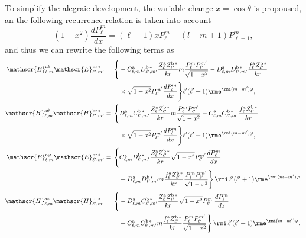 To simplify the alegraic development, the variable change $x=\cos\theta$ is propoused, an the following recurrence relation is taken into account
\begin{equation}
 (1-x^2)\frac{dP_{\ell}^m}{dx} = (\ell+1) x P_{\ell}^{m}-(l-m+1)P_{\ell+1}^{m},
\end{equation}
and thus we can rewrite the following terms as 
\begin{align}
\mathscr{E}_{\ell, m}^{\text{a}\theta}\mathscr{E}_{\ell^{\prime}, m^{\prime}}^{\text{br}\,*}= \, \Bigg\{&-C_{\ell,m}^{\rm a}D_{\ell^{\prime}, m^{\prime}}^{\rm b \, *}\frac{Z_{\ell}^{\rm a}Z_{\ell^{\prime}}^{\rm b\, *}}{k r} m \frac{P_{\ell}^{m}P_{\ell^{\prime}}^{m^{\prime}}}{\sqrt{1-x^2}}-D_{\ell, m}^{\rm a}D_{\ell^{\prime}, m^{\prime}}^{\rm b \, *} \frac{f_{\ell}^{\rm a}Z_{\ell^{\prime}}^{\rm b \, *}}{k r}\nonumber\\
& \times \sqrt{1-x^2} P_{\ell^{\prime}}^{m^{\prime}} \frac{dP_{\ell}^m}{dx}\Bigg\}\ell^{\prime}(\ell^{\prime}+1)  \rme^{\rmi (m-m^{\prime})\varphi },\\
\mathscr{H}_{\ell, m}^{\text{a}\theta}\mathscr{H}_{\ell^{\prime}, m^{\prime}}^{\text{br}\,*}= \, \Bigg\{& D_{\ell,m}^{\rm a}C_{\ell^{\prime}, m^{\prime}}^{\rm b \, *}\frac{Z_{\ell}^{\rm a}Z_{\ell^{\prime}}^{\rm b\, *}}{k r} m \frac{P_{\ell}^{m}P_{\ell^{\prime}}^{m^{\prime}}}{\sqrt{1-x^2}}-C_{\ell, m}^{\rm a}C_{\ell^{\prime}, m^{\prime}}^{\rm b \, *} \frac{f_{\ell}^{\rm a}Z_{\ell^{\prime}}^{\rm b \, *}}{k r}\nonumber\\
& \times \sqrt{1-x^2} P_{\ell^{\prime}}^{m^{\prime}} \frac{dP_{\ell}^m}{dx}\Bigg\}\ell^{\prime}(\ell^{\prime}+1)  \rme^{\rmi (m-m^{\prime})\varphi },\\
\mathscr{E}_{\ell, m}^{\text{a}\varphi}\mathscr{E}_{\ell^{\prime}, m^{\prime}}^{\text{br}\,*} = \, \Bigg\{& C_{\ell, m}^{\rm a} D_{\ell^{\prime}, m^{\prime}}^{\rm b \, *} \frac{Z_{\ell}^{\rm a} Z_{\ell^{\prime}}^{\rm b \, *}}{k r} \sqrt{1-x^2} P_{\ell^{\prime}}^{m^{\prime}} \frac{dP_{\ell}^m}{dx}\nonumber\\
& + D_{\ell, m}^{\rm a} D_{\ell^{\prime}, m^{\prime}}^{\rm b \, *} m \frac{f_{\ell}^{\rm a} Z_{\ell^{\prime}}^{\rm b\, *}}{k r} \frac{P_{\ell}^{m} P_{\ell^{\prime}}^{m^{\prime}}}{\sqrt{1-x^2}} \Bigg\} \, \rmi \, \ell^{\prime}(\ell^{\prime}+1)  \rme^{\rmi (m-m^{\prime})\varphi },\\
\mathscr{H}_{\ell, m}^{\text{a}\varphi}\mathscr{H}_{\ell^{\prime}, m^{\prime}}^{\text{br}\,*} = \, \Bigg\{& -D_{\ell, m}^{\rm a} C_{\ell^{\prime}, m^{\prime}}^{\rm b \, *} \frac{Z_{\ell}^{\rm a} Z_{\ell^{\prime}}^{\rm b \, *}}{k r} \sqrt{1-x^2} P_{\ell^{\prime}}^{m^{\prime}} \frac{dP_{\ell}^m}{dx}\nonumber\\
& + C_{\ell, m}^{\rm a} C_{\ell^{\prime}, m^{\prime}}^{\rm b \, *} m \frac{f_{\ell}^{\rm a} Z_{\ell^{\prime}}^{\rm b\, *}}{k r} \frac{P_{\ell}^{m} P_{\ell^{\prime}}^{m^{\prime}}}{\sqrt{1-x^2}} \Bigg\} \, \rmi \, \ell^{\prime}(\ell^{\prime}+1)  \rme^{\rmi (m-m^{\prime})\varphi }.
\end{align}  

